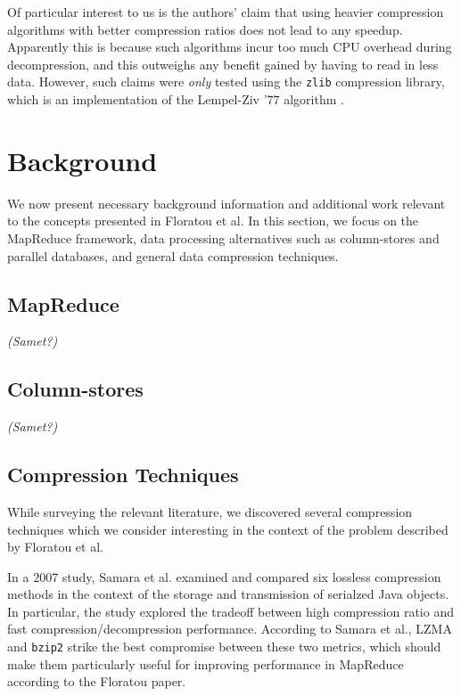 \documentclass[twocolumn]{article}
\begin{document}
Of particular interest to us is the authors' claim that using heavier compression
algorithms with better compression ratios does not lead to any speedup.  Apparently
this is because such algorithms incur too much CPU overhead during decompression,
and this outweighs any benefit gained by having to read in less data.  However,
such claims were \emph{only} tested using the \verb+zlib+ compression library,
which is an implementation of the Lempel-Ziv '77 algorithm \cite{ref:lz77}.

\section{Background}

We now present necessary background information and additional work
relevant to the concepts presented in Floratou et al.  In this section,
we focus on the MapReduce framework, data processing alternatives such
as column-stores and parallel databases, and general data compression
techniques.

\subsection{MapReduce}

\emph{(Samet?)}

\subsection{Column-stores}

\emph{(Samet?)}


\subsection{Compression Techniques}

While surveying the relevant literature, we discovered several
compression techniques which we consider interesting in the context
of the problem described by Floratou et al.

In a 2007 study, Samara et al. \cite{ref:comp-study} examined and compared
six lossless compression methods in the context of the storage and
transmission of serialzed Java objects.  In particular, the study
explored the tradeoff between high compression
ratio and fast compression/decompression performance.  According to Samara
et al., LZMA and \verb+bzip2+ strike the best compromise between these
two metrics, which should make them particularly useful for improving
performance in MapReduce according to the Floratou paper.
\end{document}
